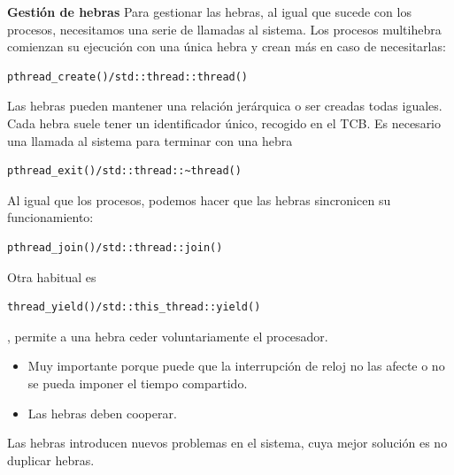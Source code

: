 \documentclass{article}
\begin{document}
\newpage

\textbf{Gestión de hebras}
Para gestionar las hebras, al igual que sucede con los procesos, necesitamos una serie de llamadas al sistema. Los procesos multihebra comienzan su ejecución con una única hebra y crean más en caso de necesitarlas:
\begin{verbatim}
pthread_create()/std::thread::thread()
\end{verbatim}

Las hebras pueden mantener una relación jerárquica o ser creadas todas iguales. Cada hebra suele tener un identificador único, recogido en el TCB. Es necesario una llamada al sistema para terminar con una hebra
\begin{verbatim}
pthread_exit()/std::thread::~thread()
\end{verbatim}

Al igual que los procesos, podemos hacer que las hebras sincronicen su funcionamiento:
\begin{verbatim}
pthread_join()/std::thread::join()
\end{verbatim}

Otra habitual es 
\begin{verbatim}
thread_yield()/std::this_thread::yield()
\end{verbatim}

, permite a una hebra ceder voluntariamente el procesador.
\begin{itemize}
\item Muy importante porque puede que la interrupción de reloj no las afecte o no se pueda imponer el tiempo compartido.

\item Las hebras deben cooperar.
\end{itemize}

Las hebras introducen nuevos problemas en el sistema, cuya mejor solución es no duplicar hebras.
\end{document}
